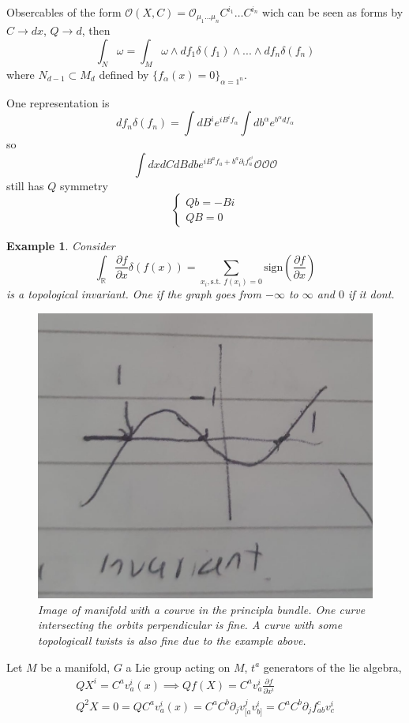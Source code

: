 \documentclass[10pt,
 article,
 amsmath,amssymb
]{revtex4-2}
\newtheorem{example}[theorem]{Example}
\newcommand{\RR}{\mathbb{R}}
\begin{document}
Obsercables of the form $\mathcal{O}(X,C)=\mathcal{O}_{\mu_1\dots\mu_n} C^{i_1}\dots C^{i_n}$ wich can be seen as forms by $C\to dx$, $Q \to d$, then 
$$\int_N \omega=\int_M \omega \wedge df_1 \delta(f_1) \wedge ... \wedge df_n \delta(f_n)$$
where $N_{d-1}\subset M_d$ defined by $\{f_\alpha(x)=0\}_{\alpha=1^n}$. 

One representation is 
$$df_n\delta(f_n)=\int dB^i e^{i B^i f_\alpha} \int db^\alpha e^{b^\alpha d f_\alpha}$$
so \begin{equation}
    \int dx dC dB db e^{iB^a f_a +b^a \partial_i f_a^{c^i} } \mathcal{O} \mathcal{O} \mathcal{O}
\end{equation}
still has $Q$ symmetry $$\begin{cases}
    Qb=-B i\\
    QB=0
\end{cases}$$


\begin{example}
    Consider $$\int_{\RR} \frac{\partial f}{\partial x} \delta(f(x))= \sum_{x_i, \text{s.t. }f(x_i)=0} \text{sign}( \frac{\partial f}{\partial x} )$$
    is a topological invariant. One if the graph goes from $-\infty$ to $\infty$ and $0$ if it dont.
    \begin{figure}
        \begin{center}
            \includegraphics[scale=0.2]{topinv}
       \caption{Image of manifold with a courve in the principla bundle. One curve intersecting the orbits perpendicular is fine. 
       A curve with some topologicall twists is also fine due to the example above.}    
        \end{center}
       
    \end{figure}
\end{example}
Let $M$ be a manifold, $G$ a Lie group acting on $M$, $t^a$ generators of the lie algebra, 
\begin{align}
    QX^i=C^a v_a^i(x) \implies Q f(X)= C^a v_a^i  \frac{\partial f}{\partial x^i}\\
    Q^2X=0 =QC^a v_a^i(x) = C^a C^b \partial_j v_{[a}^j v_{b]}^i =C^a C^b \partial_j  f_{ab}^c v_c^i 
\end{align}
\end{document}
